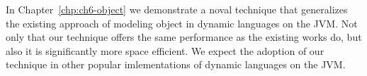 In Chapter~\ref{chp:ch6-object} we demonstrate a noval technique that generalizes the existing approach of modeling object in dynamic languages on the JVM.
Not only that our technique offers the same performance as the existing works do, but also it is significantly more space efficient.
We expect the adoption of our technique in other popular imlementations of dynamic languages on the JVM.